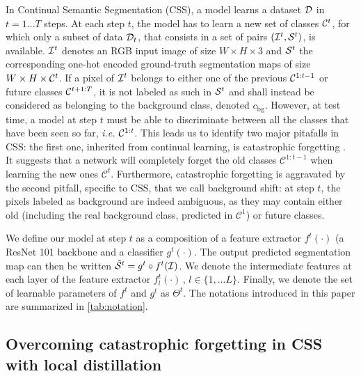 

In Continual Semantic Segmentation (CSS), a model learns a dataset  $\mathcal{D}$ in $t=1 \dots T$ steps.
At each step $t$, the model has to learn a new set of classes $\mathcal{C}^t$, for which only a subset of
data $\mathcal{D}_t$, that consists in a set of pairs $(\mathcal{I}^t, \mathcal{S}^t)$, is available. $\mathcal{I}^t$ denotes an
RGB input image of size $W \times H \times 3$ and $\mathcal{S}^t$ the corresponding one-hot encoded
ground-truth segmentation maps of size $W \times H \times \mathcal{C}^t$. If a pixel of $\mathcal{I}^t$ belongs to
either one of the previous $\mathcal{C}^{1:t-1}$ or future classes $\mathcal{C}^{t+1:T}$, it is not labeled as
such in $\mathcal{S}^t$ and shall instead be considered as belonging to the background class, denoted
$c_\text{bg}$. However, at test time, a model at step $t$ must be able to discriminate between all
the classes that have been seen so far, \textit{i.e.} $\mathcal{C}^{1:t}$. This leads us to identify two
major pitafalls in CSS: the first one, inherited from continual learning, is catastrophic forgetting
\citep{robins1995catastrophicforgetting,french1999catastrophicforgetting}. It suggests that a network
will completely forget the old classes $\mathcal{C}^{1:t-1}$ when learning the new ones
$\mathcal{C}^t$. Furthermore, catastrophic forgetting is aggravated by the second pitfall, specific
to CSS, that we call background shift: at step $t$, the pixels labeled as background are indeed
ambiguous, as they may contain either old (including the real background class, predicted in
$\mathcal{C}^{1}$) or future classes.

We define our model at step $t$ as a composition of a feature extractor $f^t(\cdot)$ (a ResNet 101
\citep{he2016resnet} backbone and a classifier $g^t(\cdot)$. The output predicted segmentation map
can then be written $\hat{\mathcal{S}}^t = g^t \circ f^t(\mathcal{I})$. We denote the intermediate features at
each layer of the feature extractor $f_l^t(\cdot)\,,\, l \in \{1, \dots L\}$. Finally, we denote the
set of learnable parameters of $f^t$ and $g^t$ as $\Theta^t$. The notations introduced in this paper
are summarized in \autoref{tab:notation}.


\subsection{Overcoming catastrophic forgetting in CSS with local
    distillation}\label{sec:distillation}


